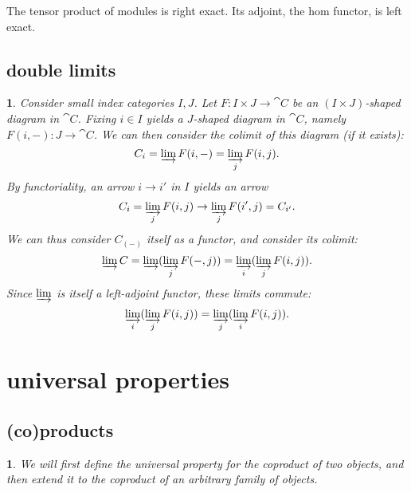 \documentclass[12pt]{article}
\newtheorem{para}[theorem]{}
\begin{document}
\begin{example}
	The tensor product of modules is right exact. Its adjoint, the hom functor, is left exact.
\end{example}


\subsection{double limits} %

\begin{para}
	Consider small index categories $I,J$. Let $F:I\times J\to\cat{C}$ be an $(I\times J)$-shaped diagram in $\cat{C}$. Fixing $i\in I$ yields a $J$-shaped diagram in $\cat{C}$, namely $F(i, -):J\to \cat{C}$. We can then consider the colimit of this diagram (if it exists):
	\begin{equation*}
		C_i = \varinjlim F(i, -) = \varinjlim_j F(i, j).
	\end{equation*}
	By functoriality, an arrow $i\to i'$ in $I$ yields an arrow 
	\begin{equation*}
		C_i = \varinjlim_j F(i, j) \to \varinjlim_j F(i', j) = C_{i'}.
	\end{equation*}
	We can thus consider $C_{(-)}$ itself as a functor, and consider its colimit:
	\begin{equation*}
		\varinjlim C = \varinjlim( \varinjlim_j F(-, j)) = \varinjlim_i (\varinjlim_j F(i, j)).
	\end{equation*}
	Since $\varinjlim$ is itself a left-adjoint functor, these limits commute:
	\begin{equation*}
		\varinjlim_i ( \varinjlim_j F(i, j)) = \varinjlim_j (\varinjlim_i F(i, j)).
	\end{equation*}
\end{para}



\section{universal properties} %

\subsection{(co)products} %

\begin{para}
	We will first define the universal property for the coproduct of two objects, and then extend it to the coproduct of an arbitrary family of objects.
\end{para}
\end{document}

